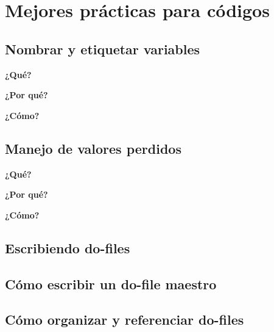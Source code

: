 \documentclass[11pt,en]{elegantpaper}
\begin{document}
\section{Mejores prácticas para códigos}

\subsection{Nombrar y etiquetar variables}
\textbf{¿Qué?}


\textbf{¿Por qué?} 


\textbf{¿Cómo?} 
\subsection{Manejo de valores perdidos}
\textbf{¿Qué?}


\textbf{¿Por qué? }


\textbf{¿Cómo? }
\subsection{Escribiendo do-files}

\subsection{Cómo escribir un do-file maestro}

\subsection{Cómo organizar y referenciar do-files}
\end{document}

